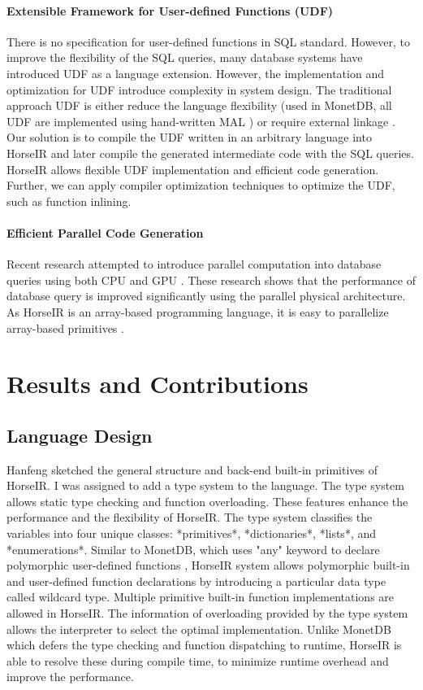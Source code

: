 \documentclass[sigplan]{acmart}
\begin{document}
\paragraph{Extensible Framework for User-defined Functions (UDF)}
There is no specification for user-defined functions in SQL standard. However,
to improve the flexibility of the SQL queries, many database systems have
introduced UDF as a language extension. However, the implementation and
optimization for UDF introduce complexity in system design. The traditional
approach UDF is either reduce the language flexibility (used in MonetDB, all
UDF are implemented using hand-written MAL \cite{MALUDF}) or require external
linkage \cite{ExternUDF}. Our solution is to compile the UDF written in an
arbitrary language into HorseIR and later compile the generated intermediate
code with the SQL queries. HorseIR allows flexible UDF implementation and
efficient code generation. Further, we can apply compiler optimization
techniques to optimize the UDF, such as function inlining.

\paragraph{Efficient Parallel Code Generation}
Recent research attempted to introduce parallel computation into database
queries using both CPU\cite{DBLP:conf/sigmod/PolychroniouRR15,
DBLP:conf/sigmod/ZhouR02} and GPU \cite{DBLP:conf/ica3pp/CremerBMM16}.
These research shows that the performance of database query is improved
significantly using the parallel physical architecture. As HorseIR is an
array-based programming language, it is easy to parallelize array-based
primitives \cite{DBLP:conf/pldi/ImamSLK14}.


\section{Results and Contributions}
\subsection*{Language Design}
Hanfeng sketched the general structure and back-end built-in primitives of
HorseIR. I was assigned to add a type system to the language. The type system allows
static type checking and function overloading. These features enhance the
performance and the flexibility of HorseIR. The type system classifies the
variables into four unique classes: *primitives*, *dictionaries*, *lists*, and
*enumerations*.  Similar to MonetDB, which uses "any" keyword to declare
polymorphic user-defined functions \cite{MonetDBPolymorphism}, HorseIR system
allows polymorphic built-in and user-defined function declarations by
introducing a particular data type called wildcard type. Multiple primitive
built-in function implementations are allowed in HorseIR. The information of overloading
provided by the type system allows the interpreter to select the optimal
implementation. Unlike MonetDB which defers the type checking and function
dispatching to runtime, HorseIR is able to resolve these during compile time, to
minimize runtime overhead and improve the performance.
\end{document}
